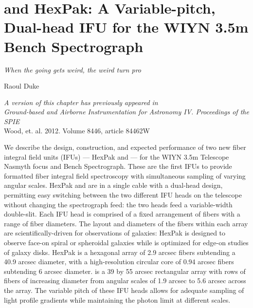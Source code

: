 \chapter[\GP Construction]{\GP and HexPak: A Variable-pitch, Dual-head IFU for the WIYN 3.5m Bench Spectrograph}
\label{chap:pak_build}
\epigraph{\fixspacing\emph{When the going gets weird, the weird turn
    pro}}{Raoul Duke}


\vfill

\begin{flushright}
  \fixspacing
  \textit{A version of this chapter has previously appeared in\\
    \emph{Ground-based and Airborne Instrumentation for Astronomy IV. Proceedings of the SPIE}}\\
    \vspace{1ex}
    Wood, et. al. 2012. Volume 8446, article 84462W
\end{flushright}

\begin{chabstract}
  We describe the design, construction, and expected performance of two new
  fiber integral field units (IFUs) --- HexPak and \GP --- for the WIYN 3.5m
  Telescope Nasmyth focus and Bench Spectrograph.  These are the first IFUs to
  provide formatted fiber integral field spectroscopy with simultaneous sampling
  of varying angular scales.  HexPak and \GP are in a single cable with a
  dual-head design, permitting easy switching between the two different IFU
  heads on the telescope without changing the spectrograph feed: the two heads
  feed a variable-width double-slit.  Each IFU head is comprised of a fixed
  arrangement of fibers with a range of fiber diameters.  The layout and
  diameters of the fibers within each array are scientifically-driven for
  observations of galaxies: HexPak is designed to observe face-on spiral or
  spheroidal galaxies while \GP is optimized for edge-on studies of galaxy
  disks.  HexPak is a hexagonal array of 2.9 arcsec fibers subtending a 40.9
  arcsec diameter, with a high-resolution circular core of 0.94 arcsec fibers
  subtending 6 arcsec diameter.  \GP is a 39 by 55 arcsec rectangular array
  with rows of fibers of increasing diameter from angular scales of 1.9 arcsec
  to 5.6 arcsec across the array.  The variable pitch of these IFU heads allows
  for adequate sampling of light profile gradients while maintaining the photon
  limit at different scales.
\end{chabstract}
\cleardoublepage

